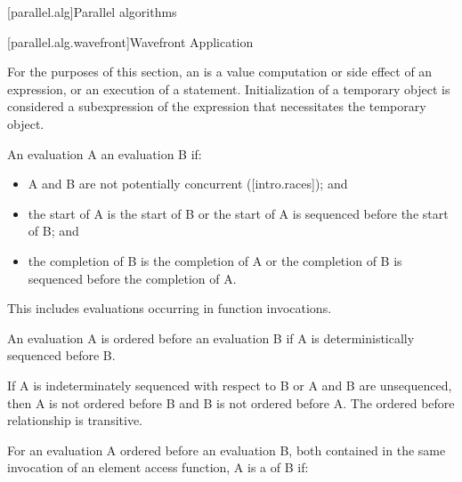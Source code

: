 
[parallel.alg]{Parallel algorithms}

[parallel.alg.wavefront]{Wavefront Application}

\pnum
For the purposes of this section, an  is a value
computation or side effect of an expression, or an execution of a statement.
Initialization of a temporary object is considered a subexpression of the
expression that necessitates the temporary object.

\pnum
An evaluation A  an evaluation B if:

\begin{itemize}
\item A and B are not potentially concurrent ([intro.races]); and
\item the start of A is the start of B or the start of A is sequenced before the start of B; and
\item the completion of B is the completion of A or the completion of B is sequenced before the completion of A.
\end{itemize}

\begin{note}
This includes evaluations occurring in function invocations.
\end{note}

\pnum
An evaluation A is ordered before an evaluation B if A is
deterministically sequenced before B. \begin{note}If A is indeterminately
sequenced with respect to B or A and B are unsequenced, then A is not ordered
before B and B is not ordered before A. The ordered before relationship is
transitive.\end{note}

\pnum
For an evaluation A ordered before an evaluation B, both contained in the
same invocation of an element access function, A is a  of B if:

